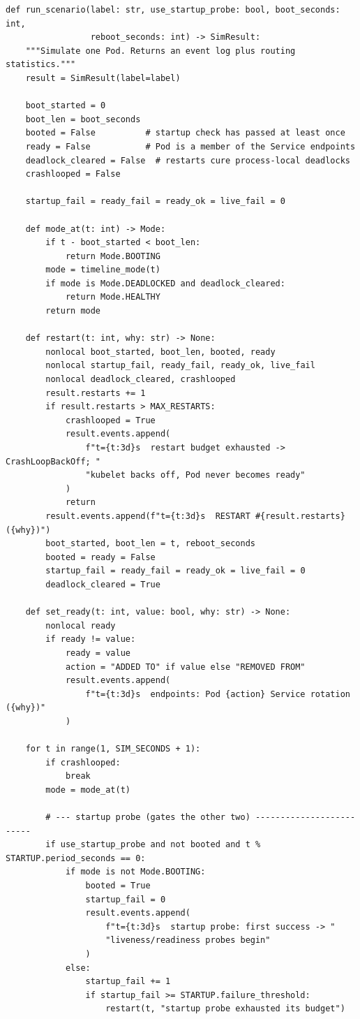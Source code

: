 \begin{verbatim}
def run_scenario(label: str, use_startup_probe: bool, boot_seconds: int,
                 reboot_seconds: int) -> SimResult:
    """Simulate one Pod. Returns an event log plus routing statistics."""
    result = SimResult(label=label)

    boot_started = 0
    boot_len = boot_seconds
    booted = False          # startup check has passed at least once
    ready = False           # Pod is a member of the Service endpoints
    deadlock_cleared = False  # restarts cure process-local deadlocks
    crashlooped = False

    startup_fail = ready_fail = ready_ok = live_fail = 0

    def mode_at(t: int) -> Mode:
        if t - boot_started < boot_len:
            return Mode.BOOTING
        mode = timeline_mode(t)
        if mode is Mode.DEADLOCKED and deadlock_cleared:
            return Mode.HEALTHY
        return mode

    def restart(t: int, why: str) -> None:
        nonlocal boot_started, boot_len, booted, ready
        nonlocal startup_fail, ready_fail, ready_ok, live_fail
        nonlocal deadlock_cleared, crashlooped
        result.restarts += 1
        if result.restarts > MAX_RESTARTS:
            crashlooped = True
            result.events.append(
                f"t={t:3d}s  restart budget exhausted -> CrashLoopBackOff; "
                "kubelet backs off, Pod never becomes ready"
            )
            return
        result.events.append(f"t={t:3d}s  RESTART #{result.restarts} ({why})")
        boot_started, boot_len = t, reboot_seconds
        booted = ready = False
        startup_fail = ready_fail = ready_ok = live_fail = 0
        deadlock_cleared = True

    def set_ready(t: int, value: bool, why: str) -> None:
        nonlocal ready
        if ready != value:
            ready = value
            action = "ADDED TO" if value else "REMOVED FROM"
            result.events.append(
                f"t={t:3d}s  endpoints: Pod {action} Service rotation ({why})"
            )

    for t in range(1, SIM_SECONDS + 1):
        if crashlooped:
            break
        mode = mode_at(t)

        # --- startup probe (gates the other two) -------------------------
        if use_startup_probe and not booted and t % STARTUP.period_seconds == 0:
            if mode is not Mode.BOOTING:
                booted = True
                startup_fail = 0
                result.events.append(
                    f"t={t:3d}s  startup probe: first success -> "
                    "liveness/readiness probes begin"
                )
            else:
                startup_fail += 1
                if startup_fail >= STARTUP.failure_threshold:
                    restart(t, "startup probe exhausted its budget")


\end{verbatim}
